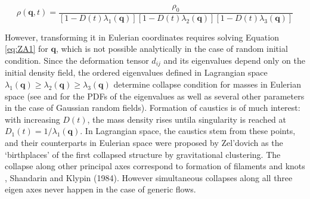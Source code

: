 \begin{equation}
 \rho(\mathbf{q}, t) = \frac{\rho_0}{ \left[1 - D(t) \lambda_1(\mathbf{q}) \right]\left[1 - D(t) \lambda_2(\mathbf{q}) \right]\left[1 - D(t) \lambda_3(\mathbf{q}) \right] }
\end{equation}

However, transforming it in Eulerian coordinates requires solving Equation \ref{eq:ZA1} for $\mathbf{q}$, which is not possible analytically in the case of random initial condition. Since the deformation tensor $d_{ij}$ and its eigenvalues depend only on the initial density field, the ordered eigenvalues defined in Lagrangian space $\lambda_1(\mathbf{q}) \geq \lambda_2(\mathbf{q}) \geq \lambda_3(\mathbf{q})$ determine collapse condition for masses in Eulerian space (see \cite{Doroshkevich1970} and \cite{Lee1998} {for the PDFs  of the eigenvalues as well as several other parameters} in the case of Gaussian random fields). Formation of caustics is of much interest: with increasing $D(t)$, the mass density rises untila singularity is reached at $D_{1}(t) = 1/\lambda_1(\mathbf{q})$. In Lagrangian space, the caustics stem from these points, and their counterparts in Eulerian space were proposed by Zel'dovich as the `birthplaces' of the first collapsed structure by gravitational clustering. The collapse along other principal axes correspond to formation of filaments and knots \citep{Arnold1982}, Shandarin and Klypin (1984). However simultaneous collapses along all three eigen axes never happen in the case of generic flows.

